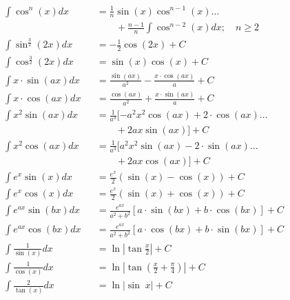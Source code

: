\begin{small}
\begin{align*}
         & \int \cos^n(x) dx              &  & = \frac{1}{n}\sin(x)\cos^{n-1}(x) \dots                         \\
         &                                &  & \qquad +\frac{n-1}{n}\int \cos^{n-2}(x) dx; \quad n\geq 2       \\
         & \int \sin^{\frac{3}{2}}(2x) dx &  & = -\frac{1}{2}\cos(2x)+C                                        \\
         & \int \cos^{\frac{3}{2}}(2x) dx &  & = \sin(x)\cos(x)+C                                              \\
         & \int x \cdot \sin(ax) dx       &  & = \frac{\sin(ax)}{a^2}-\frac{x \cdot \cos(ax)}{a}+C             \\
         & \int x \cdot \cos(ax) dx       &  & = \frac{\cos(ax)}{a^2}+\frac{x \cdot \sin(ax)}{a}+C             \\
         & \int x^2 \sin(ax) dx           &  & = \frac{1}{a^3} [-a^2x^2\cos(ax) + 2 \cdot \cos(ax) \dots       \\
         &                                &  & \qquad + 2 ax \sin(ax)]+C                                       \\
         & \int x^2 \cos(ax) dx           &  & = \frac{1}{a^3} [a^2x^2\sin(ax) - 2 \cdot \sin(ax) \dots        \\
         &                                &  & \qquad + 2ax \cos(ax)]+C                                        \\
         & \int e^x \sin(x) dx            &  & = \frac{e^x}{2}(\sin(x) - \cos(x))+C                            \\
         & \int e^x \cos(x) dx            &  & = \frac{e^x}{2}(\sin(x) + \cos(x))+C                            \\
         & \int e^{ax} \sin(bx)dx         &  & = \frac{e^{ax}}{a^2+b^2}[a\cdot \sin(bx)+b\cdot \cos(bx)]+C     \\
         & \int e^{ax} \cos(bx)dx         &  & = \frac{e^{ax}}{a^2+b^2}[a\cdot \cos(bx)+b\cdot \sin(bx)]+C     \\
         & \int \frac{1}{\sin(x)}dx       &  & = \ln\left| \tan\frac{x}{2}\right| +C                           \\
         & \int \frac{1}{\cos(x)}dx       &  & = \ln\left| \tan\left(\frac{x}{2}+\frac{\pi}{4}\right)\right|+C \\
         & \int \frac{2}{\tan(x)}dx       &  & = \ln\vert \sin\; x\vert +C                                     \\

\end{align*}
\end{small}
